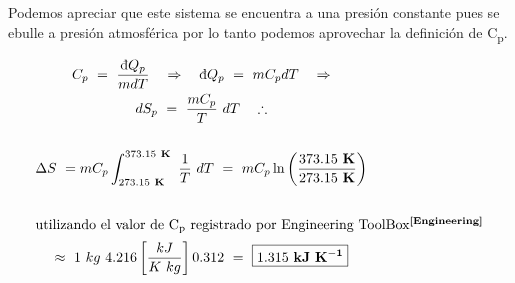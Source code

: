 
Podemos apreciar que este sistema se encuentra a una presión constante
pues se ebulle a presión atmosférica por lo tanto podemos aprovechar 
la definición de C\textsubscript{p}.

\begin{gather*}
    C_{p}\ =\ \frac{\dbar Q_{p}}{mdT}\ \ \ \Rightarrow\ \ \
    \dbar Q_{p}\ =\ mC_{p}dT\ \ \ \Rightarrow\\
    dS_{p}\ =\ \frac{mC_{p}}{T}\ dT\ \ \ \therefore\\
    \\
    \Delta S\ = mC_{p} \int_{273.15\ \um{K}}^{373.15\ \um{K}}\ \frac{1}{T}\ dT\ =\
    mC_{p} \ln{\left(\frac{373.15\ \um{K}}{273.15\ \um{K}}\right)}\\ 
    \\
    \shortintertext{utilizando el valor de C\textsubscript{p} registrado por Engineering ToolBox\cita{Engineering}}
    \approx \ 1\ kg\ 4.216 \left[\frac{kJ}{K\ kg}\right] 0.312\ =\ \boxed{1.315\ \um{kJ\ K^{-1}}}
\end{gather*}